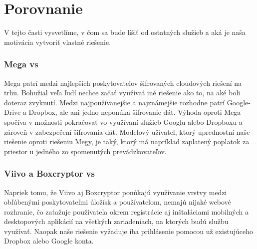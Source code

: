 \section{Porovnanie}
	V tejto časti vysvetlíme, v čom sa bude \serviceName líšiť od ostatných služieb a aká je naša motivácia vytvoriť vlastné riešenie.
	\subsubsection{Mega vs \serviceName}
	Mega patrí medzi najlepších poskytovateľov šifrovaných cloudových riešení na trhu. Bohužial veľa ľudí nechce začať využívať iné riešenie ako to, na aké boli doteraz zvyknutí. Medzi najpoužívanejšie a najznámejšie rozhodne patrí Google-Drive a Dropbox, ale ani jedno neponúka šifrovanie dát. Výhoda \serviceName oproti Mega spočíva v možnosti pokračovať vo využívaní služieb Googlu alebo Dropboxu a zároveň v zabezpečení šifrovania dát. Modelový užívateľ, ktorý uprednostní naše riešenie oproti riešeniu Megy, je taký, ktorý má napríklad zaplatený poplatok za priestor u jedného zo spomenutých prevádzkovateľov.
	
	\subsubsection{Viivo a Boxcryptor vs \serviceName}
	Napriek tomu, že Viivo aj Boxcryptor ponúkajú využívanie vrstvy medzi obľúbenými poskytovateľmi úložísk a používateľom, nemajú nijaké webové rozhranie, čo zaťažuje používateľa okrem registrácie aj inštaláciami mobilných a desktopových aplikácií na všetkých zariadeniach, na ktorých budú službu využívať. Naopak naše riešenie vyžaduje iba prihlásenie pomocou už existujúceho Dropbox alebo Google konta.